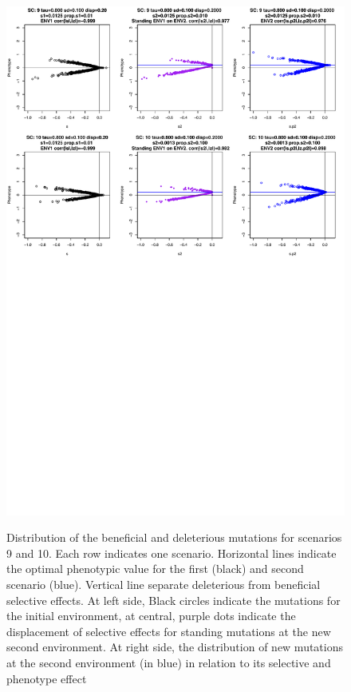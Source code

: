 \documentclass[a4paper,11pt]{article}
\begin{document}
\begin{figure}[h]
{\includegraphics[scale=0.45]{./Dist_ALLScenarios3.pdf}}
\caption{Distribution of the beneficial and deleterious mutations for scenarios 9 and 10. Each row indicates one scenario. Horizontal lines indicate the optimal phenotypic value for the first (black) and second scenario (blue). Vertical line separate deleterious from beneficial selective effects. At left side, Black circles indicate the mutations for the initial environment, at central, purple dots indicate the displacement of selective effects for standing mutations at the new second environment.  At right side, the distribution of new mutations at the second environment (in blue) in relation to its selective and phenotype effect}
\label{DistALLScenarios3}
\hspace*{-0.5cm}
\end{figure}
\end{document}
